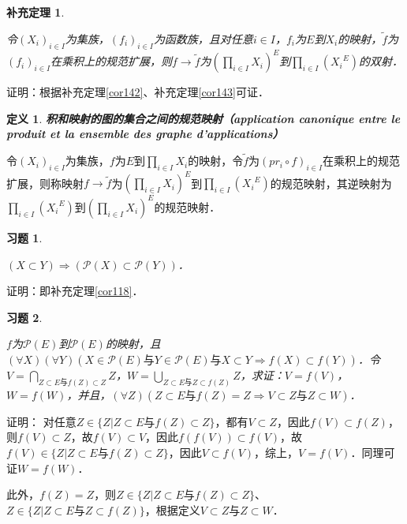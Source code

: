 \documentclass[12pt, a4paper, oneside]{book}
\newtheorem{cor}{补充定理}
\newtheorem{de}{定义}
\newtheorem{exer}{习题}
\begin{document}
			\begin{cor}\label{cor144}
				\hfill\par
				令$(X_i)_{i\in I}$为集族，$(f_i)_{i\in I}$为函数族，且对任意$i\in I$，$f_i$为$E$到$X_i$的映射，$\tilde{f}$为$(f_i)_{i\in I}$在乘积上的规范扩展，则$f\to \tilde{f}$为$(\prod\limits_{i\in I}X_i)^E$到$\prod\limits_{i\in I}({X_i}^E)$的双射．
			\end{cor}
			证明：根据补充定理\ref{cor142}、补充定理\ref{cor143}可证．

			\begin{de}
				\textbf{积和映射的图的集合之间的规范映射（application canonique entre le produit et la ensemble des graphe d'applications）}
			\end{de}			
			令$(X_i)_{i\in I}$为集族，$f$为$E$到$\prod\limits_{i\in I}X_i$的映射，令$\tilde{f}$为$(pr_i\circ f)_{i\in I}$在乘积上的规范扩展，则称映射$f\to \tilde{f}$为$(\prod\limits_{i\in I}X_i)^E$到$\prod\limits_{i\in I}({X_i}^E)$的规范映射，其逆映射为$\prod\limits_{i\in I}({X_i}^E)$到$(\prod\limits_{i\in I}X_i)^E$的规范映射．			
			
			\begin{exer}\label{exer62}
				\hfill\par
				$(X\subset Y)\Rightarrow( \mathcal{P}(X)\subset \mathcal{P}(Y))$．
			\end{exer}
			证明：即补充定理\ref{cor118}．
			
			\begin{exer}\label{exer63}
				\hfill\par
				$f$为$\mathcal{P}(E)$到$\mathcal{P}(E)$的映射，且$(\forall X)(\forall Y)(X\in \mathcal{P}(E)\text{与}Y\in \mathcal{P}(E)\text{与}X\subset Y\Rightarrow f(X)\subset f(Y))$．令$V=\bigcap\limits_{Z\subset E\text{与}f(Z)\subset Z}Z$，$W=\bigcup\limits_{Z\subset E\text{与}Z\subset f(Z)}Z$，求证：$V=f(V)$，$W=f(W)$，并且，$(\forall Z)(Z\subset E\text{与}f(Z)=Z\Rightarrow V\subset Z\text{与}Z\subset W)$．
			\end{exer}
			证明：
			对任意$Z\in \{Z|Z\subset E\text{与}f(Z)\subset Z\}$，都有$V\subset Z$，因此$f(V)\subset f(Z)$，则$f(V)\subset Z$，故$f(V)\subset V$，因此$f(f(V))\subset f(V)$，故 $f(V)\in \{Z|Z\subset E\text{与}f(Z)\subset Z\}$，因此$V\subset f(V)$，综上，$V=f(V)$．同理可证$W=f(W)$．
			\par
			此外，$f(Z)=Z$，则$Z\in \{Z|Z\subset E\text{与}f(Z)\subset Z\}$、$Z\in \{Z|Z\subset E\text{与}Z\subset f(Z)\}$，根据定义$V\subset Z\text{与}Z\subset W$．
			
\end{document}
